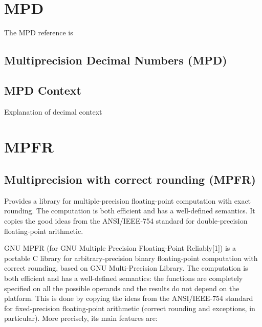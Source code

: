 \chapter{MPD}

The MPD reference is \cite{mpd_2012}

\lipsum[1]


\section{Multiprecision Decimal Numbers (MPD)}
\lipsum[5]



\section{MPD Context}

Explanation of decimal context

\lipsum[1]



\chapter{MPFR}



\section{Multiprecision with correct rounding (MPFR)}
Provides a library for multiple-precision floating-point computation with exact rounding. The computation is both efficient and has a well-defined semantics. It copies the good ideas from the ANSI/IEEE-754 standard for double-precision floating-point arithmetic. 



GNU MPFR (for GNU Multiple Precision Floating-Point Reliably[1]) is a portable C library for arbitrary-precision binary floating-point computation with correct rounding, based on GNU Multi-Precision Library. The computation is both efficient and has a well-defined semantics: the functions are completely specified on all the possible operands and the results do not depend on the platform. This is done by copying the ideas from the ANSI/IEEE-754 standard for fixed-precision floating-point arithmetic (correct rounding and exceptions, in particular). More precisely, its main features are:

